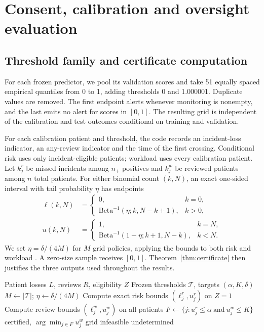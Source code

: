 \section{Consent, calibration and oversight evaluation}
\label{sec:evaluation}
\subsection{Threshold family and certificate computation}
For each frozen predictor, we pool its validation scores and take 51 equally spaced empirical quantiles from 0 to 1, adding thresholds 0 and 1.000001. Duplicate values are removed. The first endpoint alerts whenever monitoring is nonempty, and the last emits no alert for scores in $[0,1]$. The resulting grid is independent of the calibration and test outcomes conditional on training and validation.

For each calibration patient and threshold, the code records an incident-loss indicator, an any-review indicator and the time of the first crossing. Conditional risk uses only incident-eligible patients; workload uses every calibration patient. Let $k_j^r$ be missed incidents among $n_+$ positives and $k_j^w$ be reviewed patients among $n$ total patients. For either binomial count $(k,N)$, an exact one-sided interval with tail probability $\eta$ has endpoints
\begin{align}
 \ell(k,N)&=\begin{cases}0,&k=0,\\
 \mathrm{Beta}^{-1}(\eta;k,N-k+1),&k>0,
 \end{cases}\\
 u(k,N)&=\begin{cases}1,&k=N,\\
 \mathrm{Beta}^{-1}(1-\eta;k+1,N-k),&k<N.
 \end{cases}
\end{align}
We set $\eta=\delta/(4M)$ for $M$ grid policies, applying the bounds to both risk and workload \citep{clopper}. A zero-size sample receives $[0,1]$. Theorem~\ref{thm:certificate} then justifies the three outputs used throughout the results.

\begin{algorithm}[t]
\caption{Joint certification on a frozen grid}\label{alg:certify}
\begin{algorithmic}[1]
\Require Patient losses $L$, reviews $R$, eligibility $Z$
\Require Frozen thresholds $\mathcal T$, targets $(\alpha,K,\delta)$
\State $M\gets |\mathcal T|$; $\eta\gets\delta/(4M)$
\State Compute exact risk bounds $(\ell_j^r,u_j^r)$ on $Z=1$
\State Compute review bounds $(\ell_j^w,u_j^w)$ on all patients
\EndFor
\State $F\gets\{j:u_j^r\le\alpha\ \text{and}\ u_j^w\le K\}$
\State \Return certified, $\arg\min_{j\in F}u_j^w$
\State \Return grid infeasible
\Else
\State \Return undetermined
\EndIf
\end{algorithmic}
\end{algorithm}

